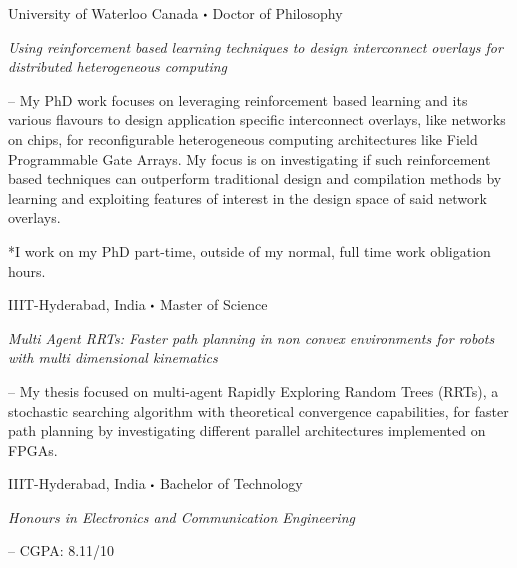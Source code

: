 	{%
		University of Waterloo Canada}
	{%
		$\sbullet$ Doctor of Philosophy
	}	
	{
	\vspace{1ex}
	\textit{Using reinforcement based learning techniques to design interconnect overlays for distributed heterogeneous computing}
	\vspace{2ex}
	
	\justify
	-- My PhD work focuses on leveraging reinforcement based learning and its various flavours to design application specific interconnect overlays, like networks on chips, for reconfigurable heterogeneous computing architectures like Field Programmable Gate Arrays. My focus is on investigating if such reinforcement based techniques can outperform traditional design and compilation methods by learning and exploiting features of interest in the design space of said network overlays.
	
	\vspace{2ex}
	\justify
	*I work on my PhD part-time, outside of my normal, full time work obligation hours.
	}

	{%
		IIIT-Hyderabad, India
	}
	{%
		$\sbullet$ Master of Science
	}	
	{
	\vspace{1ex}
	\textit{Multi Agent RRTs: Faster path planning in non convex environments for robots with multi dimensional kinematics}
	\vspace{2ex}
	
	\justify
	-- My thesis focused on multi-agent Rapidly Exploring Random Trees (RRTs), a stochastic searching algorithm with theoretical convergence capabilities, for faster path planning by investigating different parallel architectures implemented on FPGAs.
	
	}

	{%
		IIIT-Hyderabad, India}
	{%
		$\sbullet$ Bachelor of Technology
	}	
	{
	\vspace{1ex}
	\textit{Honours in Electronics and Communication Engineering}
	\vspace{2ex}
	
	-- CGPA: 8.11/10
	}